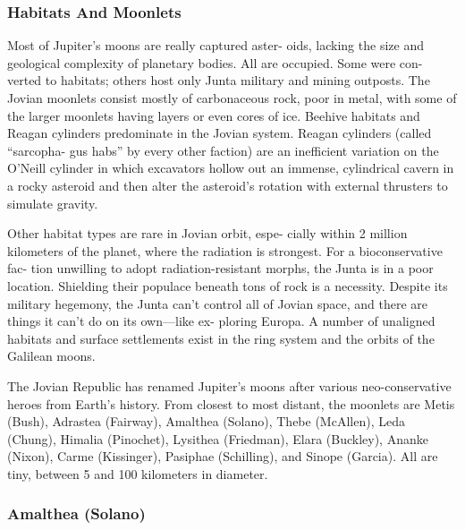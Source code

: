 \subsubsection{Habitats And Moonlets}

Most of Jupiter's moons are really captured aster-
oids, lacking the size and geological complexity of 
planetary bodies. All are occupied. Some were con-
verted to habitats; others host only Junta military and 
mining outposts. The Jovian moonlets consist mostly 
of carbonaceous rock, poor in metal, with some of 
the larger moonlets having layers or even cores of ice. 
Beehive habitats and Reagan cylinders predominate in 
the Jovian system. Reagan cylinders (called ``sarcopha-
gus habs'' by every other faction) are an inefficient 
variation on the O'Neill cylinder in which excavators 
hollow out an immense, cylindrical cavern in a rocky 
asteroid and then alter the asteroid's rotation with 
external thrusters to simulate gravity.

Other habitat types are rare in Jovian orbit, espe-
cially within 2 million kilometers of the planet, where 
the radiation is strongest. For a bioconservative fac-
tion unwilling to adopt radiation-resistant morphs, the 
Junta is in a poor location. Shielding their populace 
beneath tons of rock is a necessity. Despite its military 
hegemony, the Junta can't control all of Jovian space, 
and there are things it can't do on its own—like ex-
ploring Europa. A number of unaligned habitats and 
surface settlements exist in the ring system and the 
orbits of the Galilean moons.

The Jovian Republic has renamed Jupiter's moons 
after various neo-conservative heroes from Earth's 
history. From closest to most distant, the moonlets are 
Metis (Bush), Adrastea (Fairway), Amalthea (Solano), 
Thebe (McAllen), Leda (Chung), Himalia (Pinochet), 
Lysithea (Friedman), Elara (Buckley), Ananke (Nixon), 
Carme (Kissinger), Pasiphae (Schilling), and Sinope 
(Garcia). All are tiny, between 5 and 100 kilometers 
in diameter.

\subsubsection{Amalthea (Solano)}


